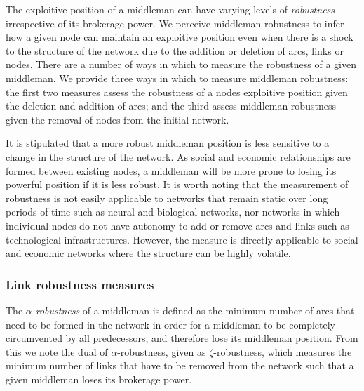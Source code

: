 \documentclass[11pt,fleqn]{article}
\begin{document}
The exploitive position of a middleman can have varying levels of \emph{robustness} irrespective of its brokerage power. We perceive middleman robustness to infer how a given node can maintain an exploitive position even when there is a shock to the structure of the network due to the addition or deletion of arcs, links or nodes. There are a number of ways in which to measure the robustness of a given middleman. We provide three ways in which to measure middleman robustness: the first two measures assess the robustness of a nodes exploitive position given the deletion and addition of arcs; and the third assess middleman robustness given the removal of nodes from the initial network.

It is stipulated that a more robust middleman position is less sensitive to a change in the structure of the network. As social and economic relationships are formed between existing nodes, a middleman will be more prone to losing its powerful position if it is less robust. It is worth noting that the measurement of robustness is not easily applicable to networks that remain static over long periods of time such as neural and biological networks, nor networks in which individual nodes do not have autonomy to add or remove arcs and links such as technological infrastructures. However, the measure is directly applicable to social and economic networks where the structure can be highly volatile.

\subsubsection{Link robustness measures}

The \emph{$\alpha$-robustness} of a middleman is defined as the minimum number of arcs that need to be formed in the network in order for a middleman to be completely circumvented by all predecessors, and therefore lose its middleman position. From this we note the dual of $\alpha$-robustness, given as $\zeta$-robustness, which measures the minimum number of links that have to be removed from the network such that a given middleman loses its brokerage power.
\end{document}
